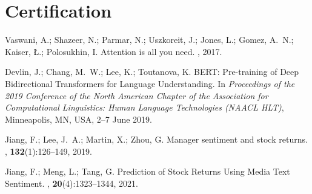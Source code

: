 \documentclass[12pt]{article}
\begin{document}
\section*{Certification}

\begin{thebibliography}{100}

Vaswani, A.; Shazeer, N.; Parmar, N.; Uszkoreit, J.; Jones, L.; Gomez, A.~N.; Kaiser, {\L}.; Polosukhin, I. 
\newblock Attention is all you need.
, 2017.

Devlin, J.; Chang, M.~W.; Lee, K.; Toutanova, K.
\newblock BERT: Pre-training of Deep Bidirectional Transformers for Language Understanding.
\newblock In {\em Proceedings of the 2019 Conference of the North American Chapter of the Association for Computational Linguistics: Human Language Technologies (NAACL HLT)}, Minneapolis, MN, USA, 2--7 June 2019.

Jiang, F.; Lee, J.~A.; Martin, X.; Zhou, G.
\newblock Manager sentiment and stock returns.
, \textbf{132}(1):126--149, 2019.

Jiang, F.; Meng, L.; Tang, G.
\newblock Prediction of Stock Returns Using Media Text Sentiment.
, \textbf{20}(4):1323--1344, 2021.

\end{thebibliography}
\end{document}
